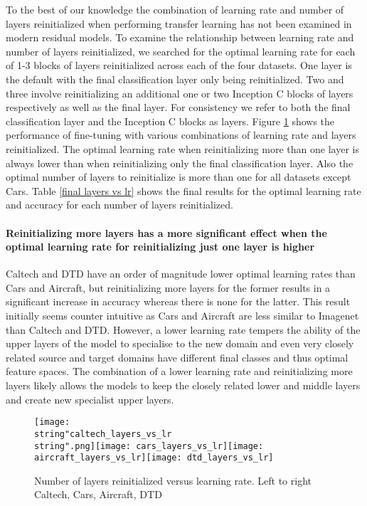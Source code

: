 \documentclass[]{article}
\begin{document}
To the best of our knowledge the combination of learning rate and
number of layers reinitialized when performing transfer learning has
not been examined in modern residual models. To examine the relationship
between learning rate and number of layers reinitialized, we searched
for the optimal learning rate for each of 1-3 blocks of layers reinitialized
across each of the four datasets. One layer is the default with the
final classification layer only being reinitialized. Two and three
involve reinitializing an additional one or two Inception C blocks
of layers respectively as well as the final layer. For consistency
we refer to both the final classification layer and the Inception
C blocks as layers. Figure \ref{layers vs lr} shows the performance of fine-tuning
with various combinations of learning rate and layers reinitialized.
The optimal learning rate when reinitializing more than one layer
is always lower than when reinitializing only the final classification
layer. Also the optimal number of layers to reinitialize is more than
one for all datasets except Cars. Table \ref{final layers vs lr} shows the final results
for the optimal learning rate and accuracy for each number of layers
reinitialized. 

\paragraph{Reinitializing more layers has a more significant effect when the
optimal learning rate for reinitializing just one layer is higher}

Caltech and DTD have an order of magnitude lower optimal learning
rates than Cars and Aircraft, but reinitializing more layers for the
former results in a significant increase in accuracy whereas there
is none for the latter. This result initially seems counter intuitive
as Cars and Aircraft are less similar to Imagenet than Caltech and
DTD. However, a lower learning rate tempers the ability of the upper
layers of the model to specialise to the new domain and even very
closely related source and target domains have different final classes
and thus optimal feature spaces. The combination of a lower learning
rate and reinitializing more layers likely allows the models to keep
the closely related lower and middle layers and create new specialist
upper layers.

\begin{figure}[th]

\begin{centering}
\label{layers vs lr}
\texttt{[image: \\string"caltech\_layers\_vs\_lr\\string".png]}\texttt{[image: cars\_layers\_vs\_lr]}\texttt{[image: aircraft\_layers\_vs\_lr]}\texttt{[image: dtd\_layers\_vs\_lr]}
\caption{Number of layers reinitialized versus learning rate. Left to right Caltech, Cars, Aircraft, DTD }
\par\end{centering}
\end{figure}
\end{document}
